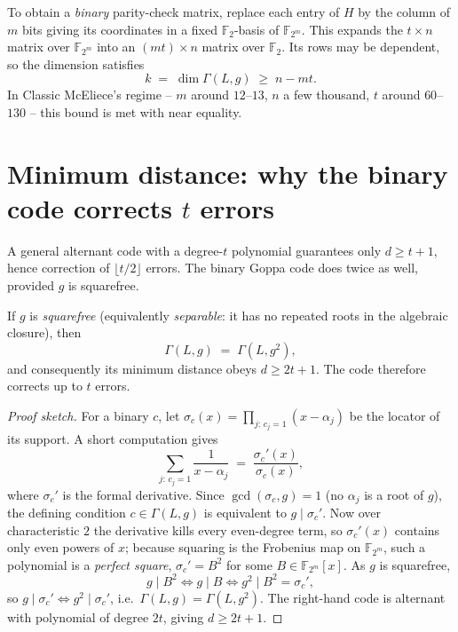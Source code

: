 To obtain a \emph{binary} parity-check matrix, replace each entry of $H$ by the column of $m$ bits giving its coordinates in a fixed $\mathbb{F}_2$-basis of $\mathbb{F}_{2^m}$. This expands the $t\times n$ matrix over $\mathbb{F}_{2^m}$ into an $(mt)\times n$ matrix over $\mathbb{F}_2$. Its rows may be dependent, so the dimension satisfies
\[
k \;=\; \dim \Gamma(L,g) \;\ge\; n - m t .
\]
In Classic McEliece's regime -- $m$ around $12$--$13$, $n$ a few thousand, $t$ around $60$--$130$ -- this bound is met with near equality.

\section{Minimum distance: why the binary code corrects \texorpdfstring{$t$}{t} errors}
\label{sec:goppa-distance}

A general alternant code with a degree-$t$ polynomial guarantees only $d \ge t+1$, hence correction of $\lfloor t/2\rfloor$ errors. The binary Goppa code does twice as well, provided $g$ is squarefree.

\begin{proposition}
\label{prop:goppa-double}
If $g$ is \emph{squarefree} (equivalently \emph{separable}: it has no repeated roots in the algebraic closure), then
\[
\Gamma(L,g) \;=\; \Gamma(L,g^2),
\]
and consequently its minimum distance obeys $d \ge 2t+1$. The code therefore corrects up to $t$ errors.
\end{proposition}

\begin{proof}[Proof sketch]
For a binary $c$, let $\sigma_c(x)=\prod_{j:\,c_j=1}(x-\alpha_j)$ be the locator of its support. A short computation gives
\[
\sum_{j:\,c_j=1}\frac{1}{x-\alpha_j} \;=\; \frac{\sigma_c'(x)}{\sigma_c(x)},
\]
where $\sigma_c'$ is the formal derivative. Since $\gcd(\sigma_c,g)=1$ (no $\alpha_j$ is a root of $g$), the defining condition $c\in\Gamma(L,g)$ is equivalent to $g \mid \sigma_c'$. Now over characteristic $2$ the derivative kills every even-degree term, so $\sigma_c'(x)$ contains only even powers of $x$; because squaring is the Frobenius map on $\mathbb{F}_{2^m}$, such a polynomial is a \emph{perfect square}, $\sigma_c'=B^2$ for some $B\in\mathbb{F}_{2^m}[x]$. As $g$ is squarefree,
\[
g \mid B^2 \iff g \mid B \iff g^2 \mid B^2=\sigma_c',
\]
so $g\mid\sigma_c' \Leftrightarrow g^2\mid\sigma_c'$, i.e.\ $\Gamma(L,g)=\Gamma(L,g^2)$. The right-hand code is alternant with polynomial of degree $2t$, giving $d\ge 2t+1$.
\end{proof}

